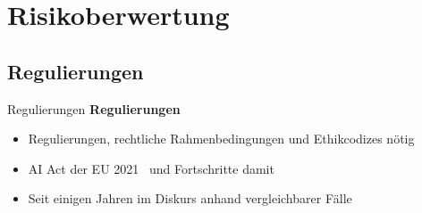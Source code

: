 \documentclass[aspectratio=169,16pt,xcolor=table]{beamer}
\begin{document}
\section{Risikoberwertung}
\subsection{Regulierungen}
\begin{frame}{Regulierungen}
    \textbf{Regulierungen}
    \begin{itemize}
      \item{Regulierungen, rechtliche Rahmenbedingungen und Ethikcodizes nötig}
      \item{AI Act der EU 2021~\cite{ai_act_eu_2021} und Fortschritte damit~\cite{ai_act_deal_2023}}
      \item{Seit einigen Jahren im Diskurs anhand vergleichbarer Fälle~\cite{lee2016cochlear}}
    \end{itemize}
\end{frame}
\end{document}
